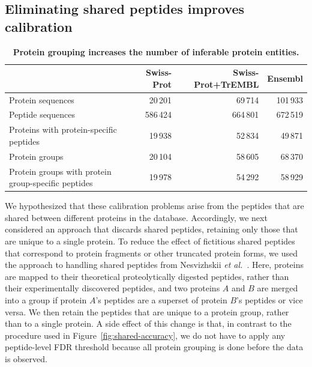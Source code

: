 \documentclass{article}
\begin{document}
\subsection*{Eliminating shared peptides improves calibration}

\begin{table}
\caption{\label{tab:duplicate-proteins}\textbf{Protein grouping
    increases the number of inferable protein entities.}}
\scriptsize
\begin{center}
\begin{tabular}{lrrr}
\hline
& Swiss-Prot & Swiss-Prot+TrEMBL & Ensembl\\
\hline
Protein sequences & 20\,201 & 69\,714 & 101\,933\\
Peptide sequences & 586\,424 & 664\,801 & 672\,519\\
Proteins with protein-specific peptides & 19\,938 & 52\,834 &
49\,871\\
Protein groups & 20\,104 & 58\,605 & 68\,370\\
Protein groups with protein group-specific peptides & 19\,978 &
54\,292 & 58\,929\\
\hline
\end{tabular}
\end{center}
\end{table}

We hypothesized that these calibration problems arise from the
peptides that are shared between different proteins in the database.
Accordingly, we next considered an approach that discards shared
peptides, retaining only those that are unique to a single protein.
To reduce the effect of fictitious shared peptides that correspond to
protein fragments or other truncated protein forms, we used the
approach to handling shared peptides from Nesvizhskii {\em et
  al.}~\cite{nesvizhskii2003statistical}. Here, proteins are mapped to
their theoretical proteolytically digested peptides, rather than their
experimentally discovered peptides, and two proteins $A$ and $B$ are
merged into a group if protein $A$'s peptides are a superset of
protein $B$'s peptides or vice versa.  We then retain the peptides
that are unique to a protein group, rather than to a single protein.
A side effect of this change is that, in contrast to the procedure
used in Figure~\ref{fig:shared-accuracy}, we do not have to apply any
peptide-level FDR threshold because all protein grouping is done
before the data is observed.
\end{document}
